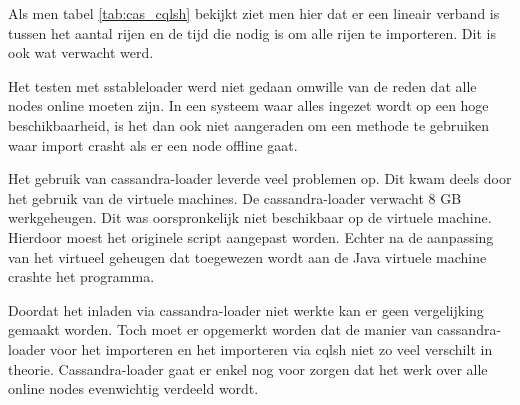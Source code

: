 Als men tabel \ref{tab:cas_cqlsh} bekijkt ziet men hier dat er een lineair verband is tussen het aantal rijen en de tijd die nodig is om alle rijen te importeren.
Dit is ook wat verwacht werd.

Het testen met sstableloader werd niet gedaan omwille van de reden dat alle nodes online moeten zijn.
In een systeem waar alles ingezet wordt op een hoge beschikbaarheid, is het dan ook niet aangeraden om een methode te gebruiken waar import crasht als er een node offline gaat.

Het gebruik van cassandra-loader leverde veel problemen op.
Dit kwam deels door het gebruik van de virtuele machines.
De cassandra-loader verwacht 8 GB werkgeheugen.
Dit was oorspronkelijk niet beschikbaar op de virtuele machine.
Hierdoor moest het originele script aangepast worden.
Echter na de aanpassing van het virtueel geheugen dat toegewezen wordt aan de Java virtuele machine crashte het programma.

Doordat het inladen via cassandra-loader niet werkte kan er geen vergelijking gemaakt worden.
Toch moet er opgemerkt worden dat de manier van cassandra-loader voor het importeren en het importeren via cqlsh niet zo veel verschilt in theorie.
Cassandra-loader gaat er enkel nog voor zorgen dat het werk over alle online nodes evenwichtig verdeeld wordt.
